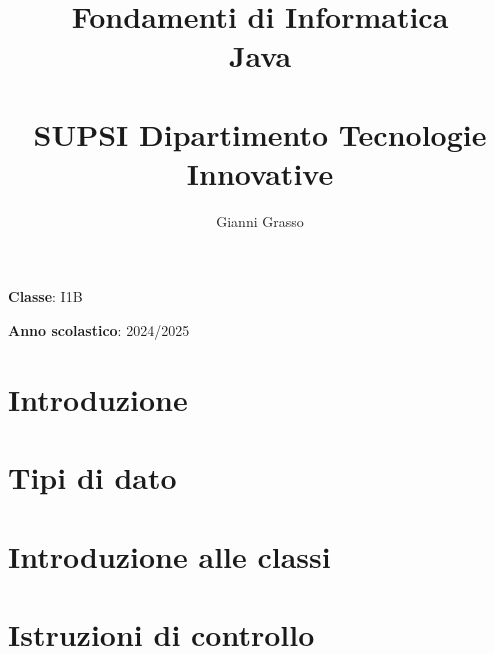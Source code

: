 \documentclass{article}
\title{
    Fondamenti di Informatica \\
    Java \\
    \phantom{}\\
    \large SUPSI Dipartimento Tecnologie Innovative
}
\author{Gianni Grasso}
\begin{document}
\maketitle
\hphantom{ }
\vspace{14.5cm}

\textbf{Classe}: I1B

\textbf{Anno scolastico}: 2024/2025
\pagebreak


\tableofcontents
\pagebreak

\section{Introduzione}

\pagebreak

\section{Tipi di dato}

\pagebreak

\section{Introduzione alle classi}

\pagebreak

\section{Istruzioni di controllo}

\pagebreak
\end{document}
